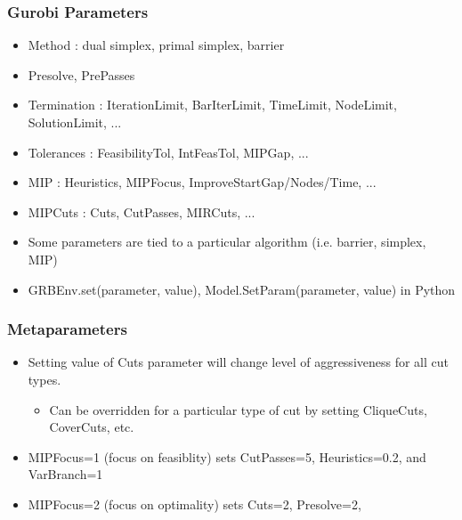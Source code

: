 \documentclass[12pt,handout]{beamer}
\begin{document}
\begin{frame}
\frametitle{Gurobi Parameters}
\begin{itemize}
\item Method : dual simplex, primal simplex, barrier
\item Presolve, PrePasses
\item Termination : IterationLimit, BarIterLimit, TimeLimit, NodeLimit, SolutionLimit, ...
\item Tolerances : FeasibilityTol, IntFeasTol, MIPGap, ...
\item MIP : Heuristics, MIPFocus, ImproveStartGap/Nodes/Time, ...
\item MIPCuts : Cuts, CutPasses, MIRCuts, ...
\item Some parameters are tied to a particular algorithm (i.e. barrier, simplex, MIP)
\item GRBEnv.set(parameter, value), Model.SetParam(parameter, value) in Python
\end{itemize}
\end{frame}

\begin{frame}
\frametitle{Metaparameters}
\begin{itemize}
\item Setting value of Cuts parameter will change level of aggressiveness for all cut types.
    \begin{itemize}
    \item Can be overridden for a particular type of cut by setting CliqueCuts, CoverCuts, etc.
    \end{itemize}
\item MIPFocus=1 (focus on feasiblity) sets CutPasses=5, Heuristics=0.2, and VarBranch=1
\item MIPFocus=2 (focus on optimality) sets Cuts=2, Presolve=2,
\end{itemize}
\end{frame}
\end{document}
